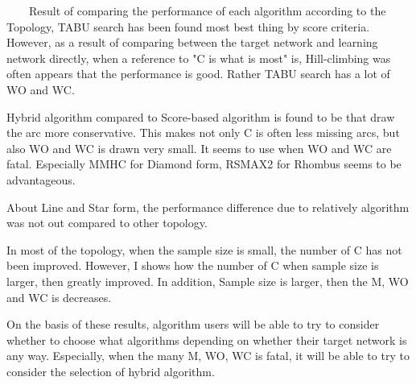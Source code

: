 ~~~~Result of comparing the performance of each algorithm according to the Topology, TABU search has been found most best thing by score criteria. However, as a result of comparing between the target network and learning network directly, when a reference to "C is what is most" is, Hill-climbing was often appears that the performance is good. Rather TABU search has a lot of WO and WC.

Hybrid algorithm compared to Score-based algorithm is found to be that draw the arc more conservative. This makes not only C is often less missing arcs, but also WO and WC is drawn very small. It seems to use when WO and WC are fatal. Especially MMHC for Diamond form, RSMAX2 for Rhombus seems to be advantageous.

About Line and Star form, the performance difference due to relatively algorithm was not out compared to other topology.

In most of the topology, when the sample size is small, the number of C has not been improved. However, I shows how the number of C when sample size is larger, then greatly improved. In addition, Sample size is larger, then the M, WO and WC is decreases.

On the basis of these results, algorithm users will be able to try to consider whether to choose what algorithms depending on whether their target network is any way. Especially, when the many M, WO, WC is fatal, it will be able to try to consider the selection of hybrid algorithm.

